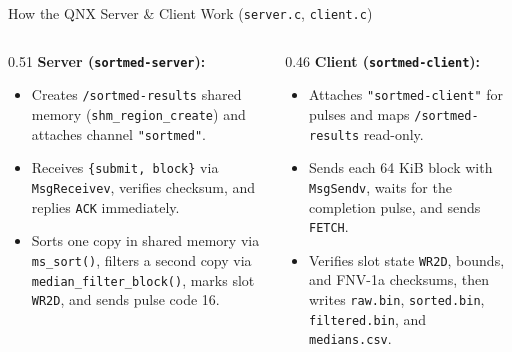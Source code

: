 \begin{frame}{How the QNX Server \& Client Work (\texttt{server.c}, \texttt{client.c})}
  \begin{columns}[t, onlytextwidth]
    \begin{column}{0.51\textwidth}
      \smalltext\compactitem
      \textbf{Server (\texttt{sortmed-server}):}
      \begin{itemize}
        \item Creates \texttt{/sortmed-results} shared memory (\texttt{shm\_region\_create}) and attaches channel \texttt{"sortmed"}.
        \item Receives \texttt{\{submit, block\}} via \texttt{MsgReceivev}, verifies checksum, and replies \texttt{ACK} immediately.
        \item Sorts one copy in shared memory via \texttt{ms\_sort()}, filters a second copy via \texttt{median\_filter\_block()}, marks slot \texttt{WR2D}, and sends pulse code 16.
      \end{itemize}
    \end{column}
    \begin{column}{0.46\textwidth}
      \smalltext\compactitem
      \textbf{Client (\texttt{sortmed-client}):}
      \begin{itemize}
        \item Attaches \texttt{"sortmed-client"} for pulses and maps \texttt{/sortmed-results} read-only.
        \item Sends each 64 KiB block with \texttt{MsgSendv}, waits for the completion pulse, and sends \texttt{FETCH}.
        \item Verifies slot state \texttt{WR2D}, bounds, and FNV-1a checksums, then writes \texttt{raw.bin}, \texttt{sorted.bin}, \texttt{filtered.bin}, and \texttt{medians.csv}.
      \end{itemize}
    \end{column}
  \end{columns}
\end{frame}

